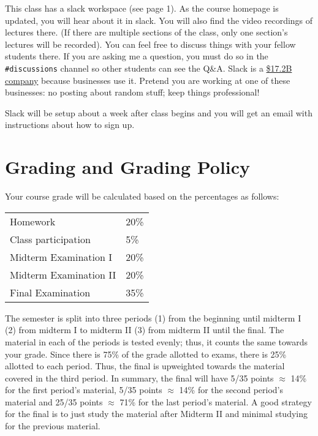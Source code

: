 \documentclass[12pt]{article}
\begin{document}
This class has a slack workspace (see page 1). As the course homepage is updated, you will hear about it in slack. You will also find the video recordings of lectures there. (If there are multiple sections of the class, only one section's lectures will be recorded). You can feel free to discuss things with your fellow students there. If you are asking me a question, you must do so in the \texttt{\#discussions} channel so other students can see the Q\&A. Slack is a \href{https://www.google.com/search?tbm=fin&q=NYSE&q=WORK}{\$17.2B company} because businesses use it. Pretend you are working at one of these businesses: no posting about random stuff; keep things professional! 

Slack will be setup about a week after class begins and you will get an email with instructions about how to sign up.

\section*{Grading and Grading Policy}\label{sec:grading}

Your course grade will be calculated based on the percentages as follows: 

\begin{table}[h]
\centering
\begin{tabular}{l|l}
Homework & 20\% \\
Class participation & 5\% \\
Midterm Examination I & 20\%\\
Midterm Examination II & 20\%\\
Final Examination & 35\%
\end{tabular}
\end{table}
\FloatBarrier

The semester is split into three periods (1) from the beginning until midterm I (2) from midterm I to midterm II (3) from midterm II until the final. The material in each of the periods is tested evenly; thus, it counts the same towards your grade. Since there is 75\% of the grade allotted to exams, there is 25\% allotted to each period. Thus, the final is upweighted towards the material covered in the third period. In summary, the final will have 5/35 points $\approx$ 14\% for the first period's material, 5/35 points $\approx$ 14\% for the second period's material and 25/35 points $\approx$ 71\% for the last period's material. A good strategy for the final is to just study the material after Midterm II and minimal studying for the previous material.
\end{document}
